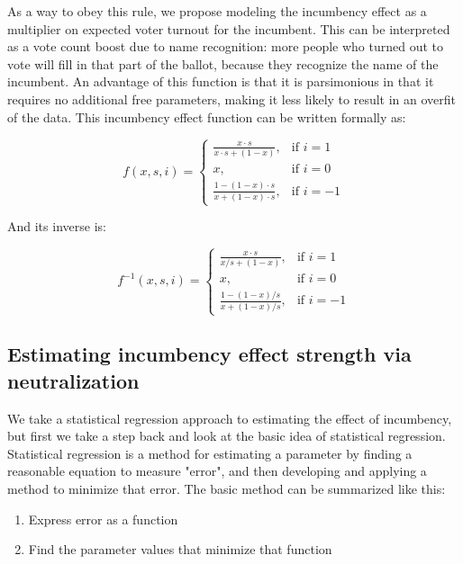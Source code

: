 \documentclass[preprint,12pt]{article}
\begin{document}
As a way to obey this rule, we propose modeling the incumbency effect as a multiplier on expected voter turnout for the incumbent.  This can be interpreted as a vote count boost due to name recognition: more people who turned out to vote will fill in that part of the ballot, because they recognize the name of the incumbent.  An advantage of this function is that it is parsimonious in that it requires no additional free parameters, making it less likely to result in an overfit of the data.  This incumbency effect function can be written formally as:

\begin{equation}
f(x,s,i) = 
\begin{cases}
	\frac{x\cdot s}{ x\cdot s + (1-x)},          & \text{if } i = 1  \\
	x,                                          & \text{if } i = 0  \\
	\frac{1 - (1-x)\cdot s}{ x + (1-x) \cdot s}, & \text{if } i = -1 
\end{cases}
\end{equation}

And its inverse is:

\begin{equation}
f^{-1}(x,s,i) = 
\begin{cases}
	\frac{x\cdot s}{ x / s + (1-x)},          & \text{if } i = 1  \\
	x,                                          & \text{if } i = 0  \\
	\frac{1 - (1-x) / s}{ x + (1-x) / s}, & \text{if } i = -1 
\end{cases}
\end{equation}

\clearpage
\subsection{Estimating incumbency effect strength via neutralization}

We take a statistical regression approach to estimating the effect of incumbency, but first we take a step back and look at the basic idea of statistical regression.  Statistical regression is a method for estimating a parameter by finding a reasonable equation to measure "error", and then developing and applying a method to minimize that error.  The basic method can be summarized like this:

\begin{enumerate}
\item Express error as a function
\item Find the parameter values that minimize that function
\end{enumerate}
\end{document}
